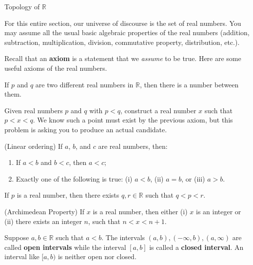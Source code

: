\begin{section}{Topology of $\mathbb{R}$}


For this entire section, our universe of discourse is the set of real numbers.  You may assume all the usual basic algebraic properties of the real numbers (addition, subtraction, multiplication, division, commutative property, distribution, etc.).

Recall that an \textbf{axiom} is a statement that we \emph{assume} to be true.  Here are some useful axioms of the real numbers.

\begin{axiom} 
If $p$ and $q$ are two different real numbers in $\mathbb{R}$, then there is a number between them.
\end{axiom}

\begin{problem}
Given real numbers $p$ and $q$ with $p<q$, construct a real number $x$ such that $p<x<q$.  We know such a point must exist by the previous axiom, but this problem is asking you to produce an actual candidate.
\end{problem}

\begin{axiom}
(Linear ordering) If $a$, $b$, and $c$ are real numbers, then:
\begin{enumerate}[label=\textrm{(\alph*)}]
\item If $a < b$ and $b<c$, then $a<c$;
\item Exactly one of the following is true: (i) $a < b$, (ii) $a=b$, or (iii) $a>b$.
\end{enumerate}
\end{axiom}

\begin{axiom}
If $p$ is a real number, then there exists $q,r\in\mathbb{R}$ such that $q<p<r$.
\end{axiom}

\begin{axiom}
(Archimedean Property) If $x$ is a real number, then either (i) $x$ is an integer or (ii) there exists an integer $n$, such that $n<x<n+1$. 
\end{axiom}

\begin{definition}
Suppose $a,b\in\mathbb{R}$ such that $a<b$.  The intervals $(a,b), (-\infty,b), (a,\infty)$ are called \textbf{open intervals} while the interval $[a,b]$ is called a \textbf{closed interval}.  An interval like $[a,b)$ is neither open nor closed.
\end{definition}


\end{section}

